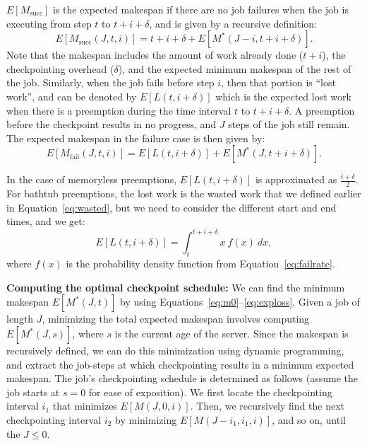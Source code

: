 $E[M_{\text{succ}}]$ is the expected makespan if there are no job failures when the job is executing from step $t$ to $t+i+\delta$, and is given by a recursive definition:
\begin{equation}
  \label{eq:msuc}
E[M_{\text{succ}}(J, t, i)] = t+i+\delta + E[M^*(J-i, t+i+\delta)].  
\end{equation}
\noindent Note that the makespan includes the amount of work already done ($t+i$), the checkpointing overhead ($\delta$), and the expected minimum makespan of the rest of the job. 
Similarly, when the job fails before step $i$, then that portion is ``lost work'', and can be denoted by $E[L(t, i+\delta)]$ which is the expected lost work when there is a preemption during the time interval $t$ to $t+i+\delta$.
A preemption before the checkpoint results in no progress, and $J$ steps of the job still remain. 
The expected makespan in the failure case is then given by:
\begin{equation}
  \label{eq:mfail}
 E[M_{\text{fail}}(J, t, i)] = E[L(t, i+\delta)] + E[M^*(J, t+i+\delta)].
\end{equation}



In the case of memoryless preemptions, $E[L(t, i+\delta)]$ is approximated as $\frac{i+\delta}{2}$.
For bathtub preemptions, the lost work is the wasted work that we defined earlier in Equation~\ref{eq:wasted}, but we need to consider the different start and end times, and we get:
\begin{equation}
  \label{eq:exploss}
E[L(t, i+\delta)] = \int_{t}^{t+i+\delta}{x~f(x)~dx}   , 
\end{equation}
where $f(x)$ is the probability density function from Equation~\ref{eq:failrate}.

\noindent \textbf{Computing the optimal checkpoint schedule:} We can find the minimum makespan $E[M^*(J, t)]$ by using Equations~\ref{eq:m0}--\ref{eq:exploss}. 
Given a job of length $J$, minimizing the total expected makespan involves computing $E[M^*(J, s)]$, where $s$ is the current age of the server. 
Since the makespan is recursively defined, we can do this minimization using dynamic programming, and extract the job-steps at which checkpointing results in a minimum expected makespan. 
The job's checkpointing schedule is determined as follows (assume the job starts at $s=0$ for ease of exposition). 
We first locate the checkpointing interval $i_1$ that minimizes $E[M(J,0,i)]$.  
Then, we recursively find the next checkpointing interval $i_2$ by minimizing  $E[M(J-i_1, i_1,i)]$, and so on, until the $J\leq0$. %

